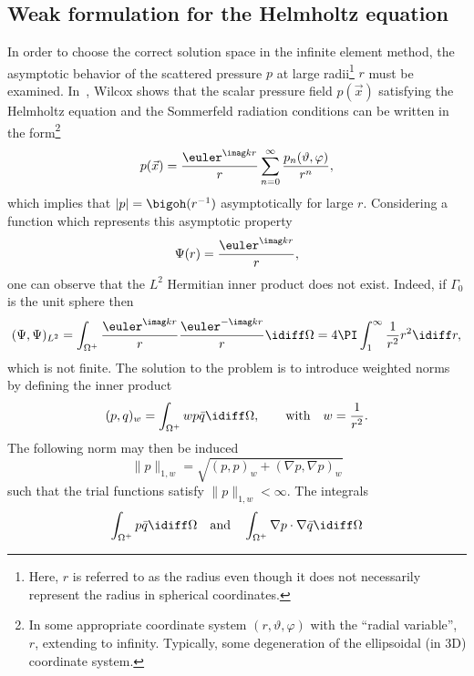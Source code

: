 \subsection{Weak formulation for the Helmholtz equation}
In order to choose the correct solution space in the infinite element method, the asymptotic behavior of the scattered pressure $p$ at large radii\footnote{Here, $r$ is referred to as the radius even though it does not necessarily represent the radius in spherical coordinates.} $r$ must be examined. In~\cite{Wilcox1956aet}, Wilcox shows that the scalar pressure field $p(\vec{x})$ satisfying the Helmholtz equation and the Sommerfeld radiation conditions can be written in the form\footnote{In some appropriate coordinate system $(r,\vartheta,\varphi)$ with the ``radial variable'', $r$, extending to infinity. Typically, some degeneration of the ellipsoidal (in 3D) coordinate system.}
\begin{equation}\label{Eq2:wilcoxExpansion}
	p(\vec{x}) = \frac{\euler^{\imag kr}}{r}\sum_{n=0}^\infty \frac{p_n(\vartheta,\varphi)}{r^n},
\end{equation}
which implies that $|p|=\bigoh(r^{-1})$ asymptotically for large $r$. Considering a function which represents this asymptotic property
\begin{equation}
	\Psi(r)=\frac{\euler^{\imag kr}}{r},
\end{equation}
one can observe that the $L^2$ Hermitian inner product does not exist. Indeed, if $\Gamma_0$ is the unit sphere then
\begin{equation*}
	(\Psi,\Psi)_{L^2} = \int_{\Omega^+} \frac{\euler^{\imag kr}}{r}\frac{\euler^{-\imag kr}}{r} \idiff \Omega= 4\PI\int_1^\infty \frac{1}{r^2}r^2\idiff r,
\end{equation*}
which is not finite. The solution to the problem is to introduce weighted norms by defining the inner product
\begin{equation}
	(p,q)_w = \int_{\Omega^+} wp\bar{q}\idiff\Omega,\qquad\text{with}\quad w= \frac{1}{r^2}.
\end{equation}
The following norm may then be induced
\begin{equation}
	\| p\|_{1,w} = \sqrt{(p,p)_w + (\nabla p,\nabla p)_w}
\end{equation}
such that the trial functions satisfy $\| p\|_{1,w}<\infty$. The integrals
\begin{equation}
	\int_{\Omega^+} p\bar{q}\idiff\Omega\quad\text{and}\quad\int_{\Omega^+}\nabla p\cdot\nabla\bar{q}\idiff\Omega
\end{equation}
